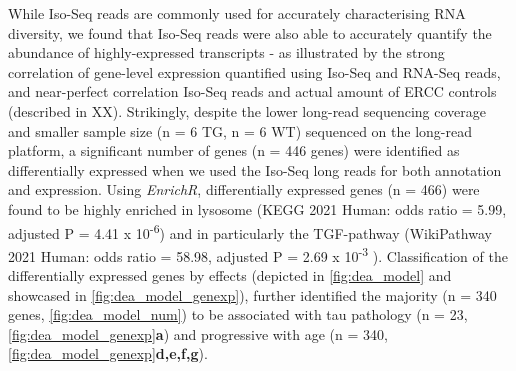 While Iso-Seq reads are commonly used for accurately characterising RNA diversity, we found that Iso-Seq reads were also able to accurately quantify the abundance of highly-expressed transcripts - as illustrated by the strong correlation of gene-level expression quantified using Iso-Seq and RNA-Seq reads, and near-perfect correlation Iso-Seq reads and actual amount of ERCC controls (described in XX). Strikingly, despite the lower long-read sequencing coverage and smaller sample size (n = 6 TG, n = 6 WT) sequenced on the long-read platform, a significant number of genes (n = 446 genes) were identified as differentially expressed when we used the Iso-Seq long reads for both annotation and expression. Using \textit{EnrichR}, differentially expressed genes (n = 466) were found to be highly enriched in lysosome (KEGG 2021 Human: odds ratio = 5.99, adjusted P = 4.41 x 10\textsuperscript{-6}) and in particularly the TGF-\textbeta pathway (WikiPathway 2021 Human: odds ratio = 58.98, adjusted P = 2.69 x 10\textsuperscript{-3} ). Classification of the differentially expressed genes by effects (depicted in \cref{fig:dea_model} and showcased in \cref{fig:dea_model_genexp}), further identified the majority (n = 340 genes, \cref{fig:dea_model_num}) to be associated with tau pathology (n = 23, \cref{fig:dea_model_genexp}\textbf{a}) and progressive with age (n = 340, \cref{fig:dea_model_genexp}\textbf{d,e,f,g}).       
 
